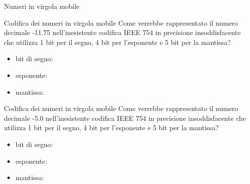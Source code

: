 \documentclass[11pt]{article}
\begin{document}
\begin{quiz}{Numeri in virgola mobile}

\begin{cloze}[points=1,shuffle=false]{Codifica dei numeri in virgola mobile}
Come verrebbe rappresentato il numero decimale -11.75 nell'inesistente codifica IEEE 754 in precisione
insoddisfacente che utilizza 1 bit per il segno, 4 bit per l'esponente e 5 bit per la mantissa?
\begin{itemize}
\item bit di segno: 
\item esponente: 
\item mantissa: 
\end{itemize}
\end{cloze}

\begin{cloze}[points=1,shuffle=false]{Codifica dei numeri in virgola mobile}
Come verrebbe rappresentato il numero decimale -5.0 nell'inesistente codifica IEEE 754 in precisione
insoddisfacente che utilizza 1 bit per il segno, 4 bit per l'esponente e 5 bit per la mantissa?
\begin{itemize}
\item bit di segno: 
\item esponente: 
\item mantissa: 
\end{itemize}
\end{cloze}


\end{quiz}
\end{document}
